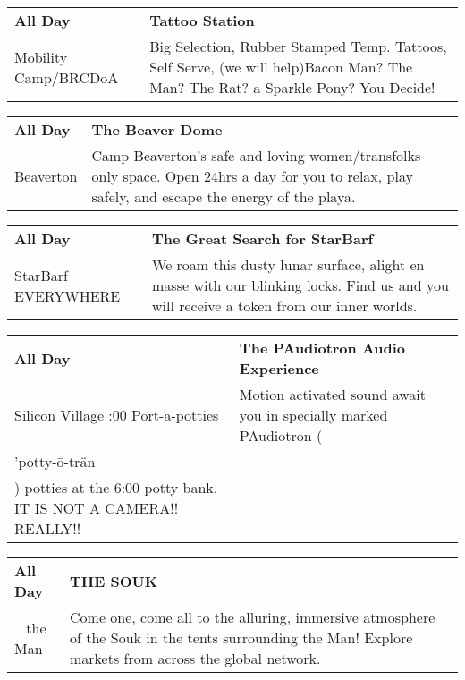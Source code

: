 \begin{tabular}{ p{1in} p{2.2in} }
    \textbf{All Day} & \textbf{Tattoo Station} \\
    Mobility Camp/BRCDoA \newline  & Big Selection, Rubber Stamped Temp. Tattoos, Self Serve, (we will help)Bacon Man? The Man? The Rat? a Sparkle Pony? You Decide! \\
    \hline 
\end{tabular}
    
\begin{tabular}{ p{1in} p{2.2in} }
    \textbf{All Day} & \textbf{The Beaver Dome} \\
    Beaverton \newline  & Camp Beaverton's safe and loving women/transfolks only space. Open 24hrs a day for you to relax, play safely, and escape the energy of the playa. \\
    \hline 
\end{tabular}
    
\begin{tabular}{ p{1in} p{2.2in} }
    \textbf{All Day} & \textbf{The Great Search for StarBarf} \\
    StarBarf \newline EVERYWHERE & We roam this dusty lunar surface, alight en masse with our blinking locks. Find us and you will receive a token from our inner worlds. \\
    \hline 
\end{tabular}
    
\begin{tabular}{ p{1in} p{2.2in} }
    \textbf{All Day} & \textbf{The PAudiotron Audio Experience} \\
    Silicon Village \newline 6:00 Port-a-potties & Motion activated sound await you in specially marked PAudiotron (\\'potty-\=o-tr\"an\\) potties at the 6:00 potty bank.  IT IS NOT A CAMERA!!  REALLY!! \\
    \hline 
\end{tabular}
    
\begin{tabular}{ p{1in} p{2.2in} }
    \textbf{All Day} & \textbf{THE SOUK} \\
    ~ \newline the Man & Come one, come all to the alluring, immersive atmosphere of the Souk in the tents surrounding the Man! Explore markets from across the global network. \\
    \hline 
\end{tabular}
    
